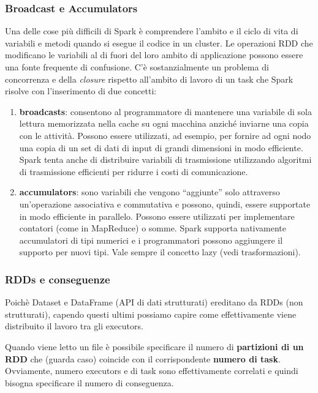 \documentclass[12pt,italian]{article}
\begin{document}
\subsubsection{Broadcast e Accumulators}\label{sec:broadcastAndAccumulators}
 Una delle cose più difficili di Spark è comprendere l'ambito e il ciclo di vita di variabili e metodi quando si esegue il codice in un cluster. Le operazioni RDD che modificano le variabili al di fuori del loro ambito di applicazione possono essere una fonte frequente di confusione. C'è sostanzialmente un problema di concorrenza e della \textit{closure} rispetto all'ambito di lavoro di un task che Spark risolve con l'inserimento di due concetti:
\begin{enumerate}
	\item \textbf{broadcasts}:  consentono al programmatore di mantenere una variabile di sola lettura memorizzata nella cache su ogni macchina anziché inviarne una copia con le attività. Possono essere utilizzati, ad esempio, per fornire ad ogni nodo una copia di un set di dati di input di grandi dimensioni in modo efficiente. Spark tenta anche di distribuire variabili di trasmissione utilizzando algoritmi di trasmissione efficienti per ridurre i costi di comunicazione.
	\item \textbf{accumulators}: sono variabili che vengono “aggiunte” solo attraverso un'operazione associativa e commutativa e possono, quindi, essere supportate in modo efficiente in parallelo. Possono essere utilizzati per implementare contatori (come in MapReduce) o somme. Spark supporta nativamente accumulatori di tipi numerici e i programmatori possono aggiungere il supporto per nuovi tipi. Vale sempre il concetto lazy (vedi trasformazioni).
\end{enumerate}

\subsubsection{RDDs e conseguenze}
Poichè Dataset e DataFrame (API di dati strutturati) ereditano da RDDs (non strutturati), capendo questi ultimi possiamo capire come effettivamente viene distribuito il lavoro tra gli executors.

Quando viene letto un file è possibile specificare il numero di \textbf{partizioni di un RDD} che (guarda caso) coincide con il corrispondente \textbf{numero di task}.
Ovviamente, numero executors e di task sono effettivamente correlati e quindi bisogna specificare il numero di conseguenza.
\end{document}

